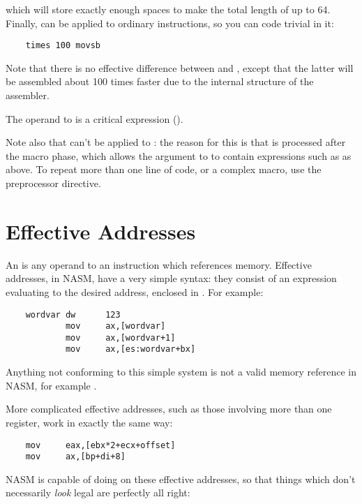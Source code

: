 which will store exactly enough spaces to make the total length of
 up to 64. Finally,  can be applied to ordinary
instructions, so you can code trivial  in it:

\begin{lstlisting}
	times 100 movsb
\end{lstlisting}

Note that there is no effective difference between  and , except that the latter will be assembled about
100 times faster due to the internal structure of the assembler.

The operand to  is a critical expression ().

Note also that  can't be applied to : the reason
for this is that  is processed after the macro phase, which
allows the argument to  to contain expressions such as
 as above. To repeat more than one line of code,
or a complex macro, use the preprocessor  directive.

\section{Effective Addresses}
\label{sec:effaddr}

An  is any operand to an instruction which
references memory. Effective addresses, in NASM,
have a very simple syntax: they consist of an expression evaluating
to the desired address, enclosed in . For
example:

\begin{lstlisting}
	wordvar dw      123
	        mov     ax,[wordvar]
	        mov     ax,[wordvar+1]
	        mov     ax,[es:wordvar+bx]
\end{lstlisting}

Anything not conforming to this simple system is not a valid memory
reference in NASM, for example .

More complicated effective addresses, such as those involving more
than one register, work in exactly the same way:

\begin{lstlisting}
	mov     eax,[ebx*2+ecx+offset]
	mov     ax,[bp+di+8]
\end{lstlisting}

NASM is capable of doing  on these effective addresses,
so that things which don't necessarily \emph{look} legal are perfectly
all right:

